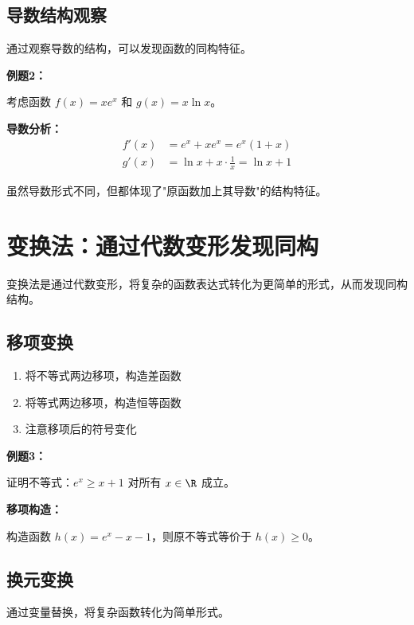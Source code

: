 \documentclass[a4paper,11pt]{ctexrep}
\newcommand{\exampleicon}{\ModeBadge[highlight]{例题}}
\newcommand{\analysisicon}{\ModeBadge[secondary]{分析}}
\theoremstyle{definition}
\begin{document}
\subsection{导数结构观察}

通过观察导数的结构，可以发现函数的同构特征。

\exampleicon \textbf{例题2：}

考虑函数 $f(x) = xe^x$ 和 $g(x) = x\ln x$。

\analysisicon \textbf{导数分析：}
\begin{align}
f'(x) &= e^x + xe^x = e^x(1+x) \\
g'(x) &= \ln x + x \cdot \frac{1}{x} = \ln x + 1
\end{align}

虽然导数形式不同，但都体现了"原函数加上其导数"的结构特征。

\section{变换法：通过代数变形发现同构}

变换法是通过代数变形，将复杂的函数表达式转化为更简单的形式，从而发现同构结构。

\subsection{移项变换}

\begin{tipbox}[移项变换技巧]
\begin{enumerate}
    \item 将不等式两边移项，构造差函数
    \item 将等式两边移项，构造恒等函数
    \item 注意移项后的符号变化
\end{enumerate}
\end{tipbox}

\exampleicon \textbf{例题3：}

证明不等式：$e^x \geq x + 1$ 对所有 $x \in \R$ 成立。

\analysisicon \textbf{移项构造：}

构造函数 $h(x) = e^x - x - 1$，则原不等式等价于 $h(x) \geq 0$。

\subsection{换元变换}

通过变量替换，将复杂函数转化为简单形式。
\end{document}
